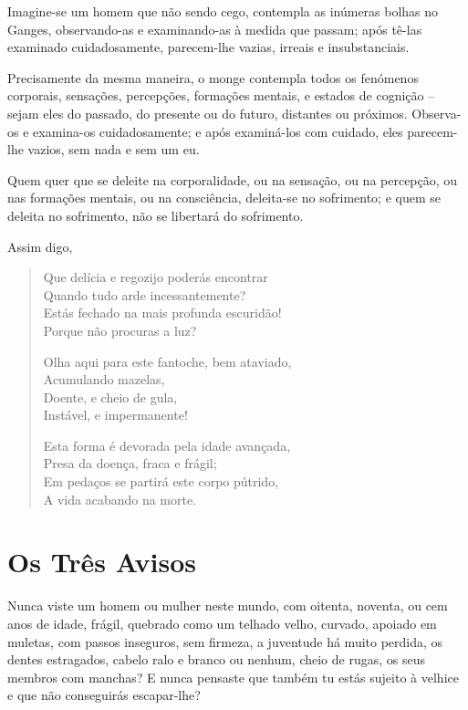 \bigskip

Imagine-se um homem que não sendo cego, contempla as inúmeras bolhas no Ganges,
observando-as e examinando-as à medida que passam; após tê-las examinado
cuidadosamente, parecem-lhe vazias, irreais e insubstanciais.

Precisamente da mesma maneira, o monge contempla todos os fenómenos corporais,
sensações, percepções, formações mentais, e estados de cognição -- sejam eles do
passado, do presente ou do futuro, distantes ou próximos. Observa-os e
examina-os cuidadosamente; e após examiná-los com cuidado, eles parecem-lhe
vazios, sem nada e sem um eu.


Quem quer que se deleite na corporalidade, ou na sensação, ou na percepção, ou
nas formações mentais, ou na consciência, deleita-se no sofrimento; e quem se
deleita no sofrimento, não se libertará do sofrimento.


Assim digo,

\begin{verse}
Que delícia e regozijo poderás encontrar\\
Quando tudo arde incessantemente?\\
Estás fechado na mais profunda escuridão!\\
Porque não procuras a luz?

Olha aqui para este fantoche, bem ataviado,\\
Acumulando mazelas,\\
Doente, e cheio de gula,\\
Instável, e impermanente!

Esta forma é devorada pela idade avançada,\\
Presa da doença, fraca e frágil;\\
Em pedaços se partirá este corpo pútrido,\\
A vida acabando na morte.
\end{verse}


\section{Os Três Avisos}

Nunca viste um homem ou mulher neste mundo, com oitenta, noventa, ou cem anos de
idade, frágil, quebrado como um telhado velho, curvado, apoiado em muletas, com
passos inseguros, sem firmeza, a juventude há muito perdida, os dentes
estragados, cabelo ralo e branco ou nenhum, cheio de rugas, os seus membros com
manchas? E nunca pensaste que também tu estás sujeito à velhice e que não
conseguirás escapar-lhe?

